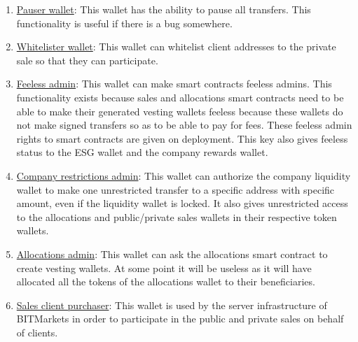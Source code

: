 \documentclass[a4paper,12pt]{article}
\begin{document}
\begin{enumerate}
  \item \label{wallet:pauser} \href{https://polygonscan.com/address/0xBdAE24Ef5E0761f07CF447DFA4cFD09f731Bd07D}{Pauser wallet}: This wallet has the ability to pause all transfers. This functionality is useful if there is a bug somewhere.

  \item \label{wallet:whitelister} \href{https://polygonscan.com/address/0xdE0c3165396636b423e46aA4CA3511799829BB16}{Whitelister wallet}: This wallet can whitelist client addresses to the private sale so that they can participate.

  \item \label{wallet:feeless} \href{https://polygonscan.com/address/0xAC32fC7000dBb0B16dd59D5537333302eCCF2555}{Feeless admin}: This wallet can make smart contracts feeless admins. This functionality exists because sales and allocations smart contracts need to be able to make their generated vesting wallets feeless because these wallets do not make signed transfers so as to be able to pay for fees. These feeless admin rights to smart contracts are given on deployment. This key also gives feeless status to the ESG wallet and the company rewards wallet.

  \item \label{wallet:restrictions} \href{https://polygonscan.com/address/0xD1c13CEB1AA523299fb8ECb089bcbAe4Fc558def}{Company restrictions admin}: This wallet can authorize the company liquidity wallet to make one unrestricted transfer to a specific address with specific amount, even if the liquidity wallet is locked. It also gives unrestricted access to the allocations and public/private sales wallets in their respective token wallets.

  \item \label{wallet:allocationsadmin} \href{https://polygonscan.com/address/0x5E47bBe7A17bF491778573971233Bb3Bcee7926d}{Allocations admin}: This wallet can ask the allocations smart contract to create vesting wallets. At some point it will be useless as it will have allocated all the tokens of the allocations wallet to their beneficiaries.

  \item \label{wallet:purchaser} \href{https://polygonscan.com/address/0xFfaA52C84A9466Ff2276F8ccaEeF6Ec7205C3AD9}{Sales client purchaser}: This wallet is used by the server infrastructure of BITMarkets in order to participate in the public and private sales on behalf of clients.
\end{enumerate}
\end{document}
